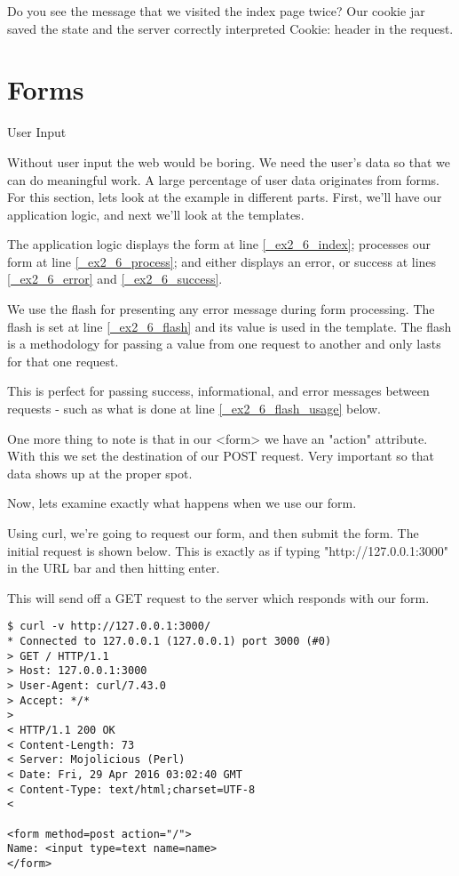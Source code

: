 \documentclass[14pt]{extreport}
\begin{document}
Do you see the message that we visited the index page twice?  Our cookie jar
saved the state and the server correctly interpreted Cookie: header in the
request.

\section{Forms}

{\Large User Input}

Without user input the web would be boring.  We need the user's data so that we
can do meaningful work.  A large percentage of user data originates from forms.
For this section, lets look at the example in different parts.  First, we'll
have our application logic, and next we'll look at the templates.

The application logic displays the form at line \ref{_ex2_6_index}; processes
our form at line \ref{_ex2_6_process}; and either displays an error, or success
at lines \ref{_ex2_6_error} and \ref{_ex2_6_success}.



We use the flash for presenting any error message during form processing.  The
flash is set at line \ref{_ex2_6_flash} and its value is used in the template.
The flash is a methodology for passing a value from one request to another and
only lasts for that one request.

This is perfect for passing success, informational, and error messages between
requests - such as what is done at line \ref{_ex2_6_flash_usage} below.

One more thing to note is that in our <form> we have an "action" attribute.
With this we set the destination of our POST request.  Very important so that
data shows up at the proper spot.

\clearpage



Now, lets examine exactly what happens when we use our form. 

Using curl, we're going to request our form, and then submit the form.  The initial
request is shown below.  This is exactly as if typing "http://127.0.0.1:3000" in the
URL bar and then hitting enter.

This will send off a GET request to the server which responds with our form.

\begin{lstlisting}[style=BashOutputStyle]
$ curl -v http://127.0.0.1:3000/
* Connected to 127.0.0.1 (127.0.0.1) port 3000 (#0)
> GET / HTTP/1.1
> Host: 127.0.0.1:3000
> User-Agent: curl/7.43.0
> Accept: */*
> 
< HTTP/1.1 200 OK
< Content-Length: 73
< Server: Mojolicious (Perl)
< Date: Fri, 29 Apr 2016 03:02:40 GMT
< Content-Type: text/html;charset=UTF-8
< 

<form method=post action="/">
Name: <input type=text name=name>
</form>
\end{lstlisting}
\end{document}
